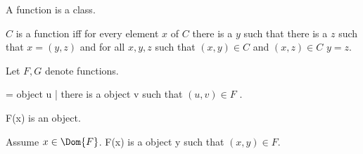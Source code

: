 \documentclass{article}
\begin{document}
\begin{forthel}
    \begin{signature}
      A function is a class.
    \end{signature}

    \begin{axiom}[RelationIntro]
      $C$ is a function iff for every element $x$ of $C$
          there is a $y$ such that there is a $z$ such that $x = (y, z)$
          and for all $x, y, z$ such that $(x, y) \in C$ and $(x, z) \in C$ $y = z$.
    \end{axiom}

    Let $F, G$ denote functions.

    \begin{definition} 
       = { object u | there is a object v such that $(u, v) \in F$ }.
    \end{definition}

    \begin{signature}
      F(x) is an object.
    \end{signature}

    \begin{axiom}
      Assume $x \in \Dom{F}$.
      F(x) is a object y such that $(x, y) \in F$.
    \end{axiom}
  \end{forthel}
\end{document}
